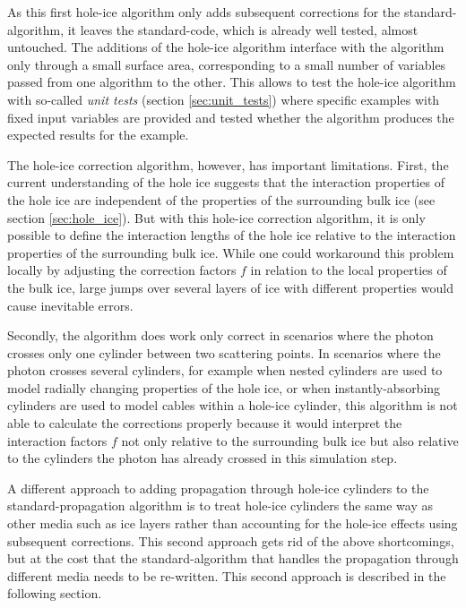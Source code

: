 As this first hole-ice algorithm only adds subsequent corrections for
the standard-\clsim algorithm, it leaves the standard-\clsim code, which
is already well tested, almost untouched. The additions of the hole-ice
algorithm interface with the \clsim algorithm only through a small
surface area, corresponding to a small number of variables passed from
one algorithm to the other. This allows to test the hole-ice algorithm
with so-called \textit{unit tests} (section \ref{sec:unit_tests}) where
specific examples with fixed input variables are provided and tested
whether the algorithm produces the expected results for the example.

The hole-ice correction algorithm, however, has important limitations.
First, the current understanding of the hole ice suggests that the
interaction properties of the hole ice are independent of the properties
of the surrounding bulk ice (see section \ref{sec:hole_ice}). But with
this hole-ice correction algorithm, it is only possible to define the
interaction lengths of the hole ice relative to the interaction
properties of the surrounding bulk ice. While one could workaround this
problem locally by adjusting the correction factors \(f\) in relation to
the local properties of the bulk ice, large jumps over several layers of
ice with different properties would cause inevitable errors.

Secondly, the algorithm does work only correct in scenarios where the
photon crosses only one cylinder between two scattering points. In
scenarios where the photon crosses several cylinders, for example when
nested cylinders are used to model radially changing properties of the
hole ice, or when instantly-absorbing cylinders are used to model cables
within a hole-ice cylinder, this algorithm is not able to calculate the
corrections properly because it would interpret the interaction factors
\(f\) not only relative to the surrounding bulk ice but also relative to
the cylinders the photon has already crossed in this simulation step.

A different approach to adding propagation through hole-ice cylinders to
the standard-propagation algorithm is to treat hole-ice cylinders the
same way as other media such as ice layers rather than accounting for
the hole-ice effects using subsequent corrections. This second approach
gets rid of the above shortcomings, but at the cost that the
standard-\clsim algorithm that handles the propagation through different
media needs to be re-written. This second approach is described in the
following section.
